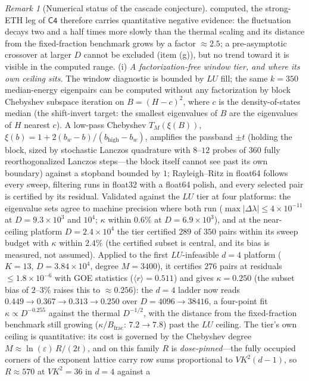 \documentclass[11pt,a4paper]{article}
\theoremstyle{plain}
\theoremstyle{definition}
\theoremstyle{remark}
\newtheorem{remark}[theorem]{Remark}
\begin{document}
\begin{remark}[Numerical status of the cascade conjecture]
computed, the strong-ETH leg of $\mathsf{C4}$ therefore carries quantitative negative evidence:
the fluctuation decays two and a half times more slowly than the thermal scaling and its
distance from the fixed-fraction benchmark grows by a factor $\approx2.5$; a pre-asymptotic
crossover at larger $D$ cannot be excluded (item (g)), but no trend toward it is visible in
the computed range.
(i) \emph{A factorization-free window tier, and where its own ceiling sits.} The window
diagnostic is bounded by $LU$ fill; the same $k=350$ median-energy eigenpairs can be
computed without any factorization by block Chebyshev subspace iteration on
$B=(H-c)^{2}$, where $c$ is the density-of-states median (the shift-invert target: the
smallest eigenvalues of $B$ are the eigenvalues of $H$ nearest $c$). A low-pass Chebyshev
$T_{M}(\xi(B))$, $\xi(b)=1+2(b_{w}-b)/(b_{\mathrm{high}}-b_{w})$, amplifies the passband
$\pm t$ (holding the block, sized by stochastic Lanczos quadrature with $8$--$12$ probes
of $360$ fully reorthogonalized Lanczos steps---the block itself cannot see past its own
boundary) against a stopband bounded by $1$; Rayleigh--Ritz in float64 follows every
sweep, filtering runs in float32 with a float64 polish, and every selected pair is
certified by its residual. Validated against the $LU$ tier at four platforms: the
eigenvalue sets agree to machine precision where both run ($\max|\Delta\lambda|\leq
4\times10^{-11}$ at $D=9.3\times10^{3}$ and $10^{4}$; $\kappa$ within $0.6\%$ at
$D=6.9\times10^{3}$), and at the near-ceiling platform $D=2.4\times10^{4}$ the tier
certified $289$ of $350$ pairs within its sweep budget with $\kappa$ within $2.4\%$ (the
certified subset is central, and its bias is measured, not assumed). Applied to the first
$LU$-infeasible $d=4$ platform ($K=13$, $D=3.84\times10^{4}$, degree $M=3400$), it
certifies $276$ pairs at residuals $\leq1.8\times10^{-6}$ with GOE statistics
($\langle r\rangle=0.511$) and gives $\kappa=0.250$ (the subset bias of $2$--$3\%$ raises
this to $\approx0.256$): the $d=4$ ladder now reads
$0.449\to0.367\to0.313\to0.250$ over $D=4096\to38416$, a four-point fit
$\kappa\propto D^{-0.255}$ against the thermal $D^{-1/2}$, with the distance from the
fixed-fraction benchmark still growing ($\kappa/B_{\mathrm{frac}}$: $7.2\to7.8$) past
the $LU$ ceiling. The tier's own ceiling is quantitative: its cost is governed by the
Chebyshev degree $M\approx\ln(\varepsilon)\,R/(2t)$, and on this family $R$ is
\emph{dose-pinned}---the fully occupied corners of the exponent lattice carry row sums
proportional to $VK^{2}(d-1)$, so $R\approx570$ at $VK^{2}=36$ in $d=4$ against a

\end{remark}
\end{document}
